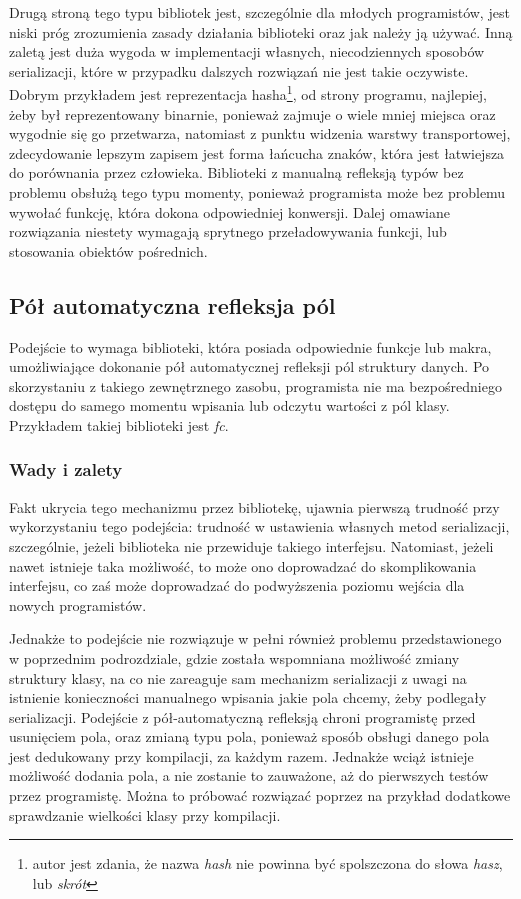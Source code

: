 \documentclass[12pt]{article}
\newcommand{\n}{\newline}
\begin{document}
{{{				Drugą stroną tego typu bibliotek jest, szczególnie dla młodych programistów, jest niski próg zrozumienia zasady działania
				biblioteki oraz jak należy ją używać. Inną zaletą jest duża wygoda w implementacji własnych, niecodziennych sposobów serializacji,
				które w przypadku dalszych rozwiązań nie jest takie oczywiste. Dobrym przykładem jest reprezentacja hasha\footnote{
					autor jest zdania, że nazwa {\it hash} nie powinna być spolszczona do słowa {\it hasz}, lub {\it skrót}\cite{hash_po_angielskiemu}
				}, od strony programu, najlepiej, żeby był reprezentowany binarnie, ponieważ zajmuje o wiele mniej miejsca oraz wygodnie się go przetwarza,
				natomiast z punktu widzenia warstwy transportowej, zdecydowanie lepszym zapisem jest forma łańcucha znaków, która jest łatwiejsza do porównania
				przez człowieka. Biblioteki z manualną refleksją typów bez problemu obsłużą tego typu momenty, ponieważ programista może bez problemu
				wywołać funkcję, która dokona odpowiedniej konwersji. Dalej omawiane rozwiązania niestety wymagają sprytnego przeładowywania funkcji, lub
				stosowania obiektów pośrednich.
			}

		{
			\subsection{Pół automatyczna refleksja pól}

			Podejście to wymaga biblioteki, która posiada odpowiednie funkcje lub makra, umożliwiające dokonanie pół automatycznej
			refleksji pól struktury danych. Po skorzystaniu z takiego zewnętrznego zasobu, programista nie ma bezpośredniego dostępu do samego momentu
			wpisania lub odczytu wartości z pól klasy. Przykładem takiej biblioteki jest {\it fc}\cite{fc_repo}.\n

			{
				\subsubsection{Wady i zalety}

				Fakt ukrycia tego mechanizmu przez bibliotekę, ujawnia pierwszą trudność przy wykorzystaniu tego podejścia: trudność w ustawienia własnych
				metod serializacji, szczególnie, jeżeli biblioteka nie przewiduje takiego interfejsu. Natomiast, jeżeli nawet istnieje taka możliwość,
				to może ono doprowadzać do skomplikowania interfejsu, co zaś może doprowadzać do podwyższenia poziomu wejścia dla nowych programistów.

				Jednakże to podejście nie rozwiązuje w pełni również problemu przedstawionego w poprzednim podrozdziale, gdzie została wspomniana
				możliwość zmiany struktury klasy, na co nie zareaguje sam mechanizm serializacji z uwagi na istnienie
				konieczności manualnego wpisania jakie pola chcemy, żeby podlegały serializacji. Podejście z pół-automatyczną refleksją
				chroni programistę przed usunięciem pola, oraz zmianą typu pola, ponieważ sposób obsługi danego pola jest dedukowany przy
				kompilacji, za każdym razem. Jednakże wciąż istnieje możliwość dodania pola, a nie zostanie to zauważone, aż do pierwszych testów
				przez programistę. Można to próbować rozwiązać poprzez na przykład dodatkowe sprawdzanie wielkości klasy przy kompilacji.
			}

}}}
\end{document}
